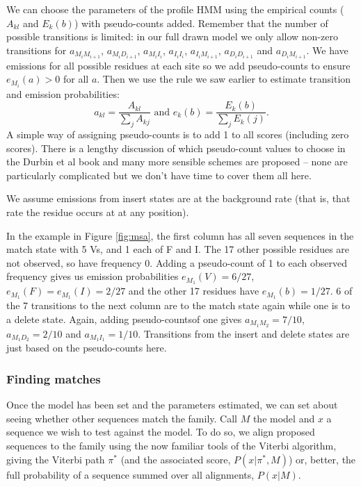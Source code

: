 \documentclass[11pt]{article}
\begin{document}
We can choose the parameters of the profile HMM using the empirical counts ($A_{kl}$ and  $E_k(b)$) with pseudo-counts added.   Remember that the number of possible  transitions is limited: in our full drawn model we only allow non-zero transitions for  $a_{M_iM_{i+1}}$,  $a_{M_iD_{i+1}}$, $a_{M_iI_i}$, $ a_{I_iI_i}$, $a_{I_iM_{i+1}}$, $a_{D_iD_{i+1}}$ and $a_{D_iM_{i+1}}$.  We have emissions for all possible residues at each site so we add pseudo-counts to ensure $e_{M_i}(a) > 0$ for all $a$.  Then we use the rule we saw earlier to estimate transition and emission probabilities:
\[a_{kl} = \frac{A_{kl}}{\sum_j A_{kj}} \mbox{ and } e_k(b)  = \frac{E_k(b)}{\sum_j E_k(j)}.\]
A simple way of assigning pseudo-counts is to add 1 to all scores (including zero scores). There is a lengthy discussion of which pseudo-count values to choose in the Durbin et al book and many more sensible schemes are proposed -- none are particularly complicated but we don't have time to cover them all here.

We assume emissions from insert states are at the background rate (that is, that rate the residue occurs at at any position).

In the example in Figure \ref{fig:msa}, the first column has all seven sequences in the match state with 5 Vs, and 1 each of F and I.  The 17 other possible residues are not observed, so have frequency 0.  Adding a pseudo-count of 1 to each observed frequency gives us emission probabilities $e_{M_1}(V) = 6/27$,  $e_{M_1}(F) =  e_{M_1}(I) = 2/27$ and the other 17 residues have  
$e_{M_1}(b) = 1/27$.  6 of the 7 transitions to the next column are to the match state again while one is to a delete state.  Again, adding pseudo-countsof one gives $a_{M_1M_2} = 7/10$, $a_{M_1D_2} = 2/10$ and $a_{M_1I_1} = 1/10$.  Transitions from the insert and delete states are just based on the pseudo-counts here.  



\subsubsection{Finding matches}

Once the model has been set and the parameters estimated, we can set about seeing whether  other sequences match the family.  Call $M$ the model and $x$ a sequence we wish to test against the model.   To do so, we align proposed sequences to the family using the now familiar tools of the Viterbi algorithm, giving the Viterbi path $\pi^*$ (and the associated score, $P(x|\pi^*,M)$) or, better, the full probability of a sequence summed over all alignments, $P(x|M)$.   
\end{document}

